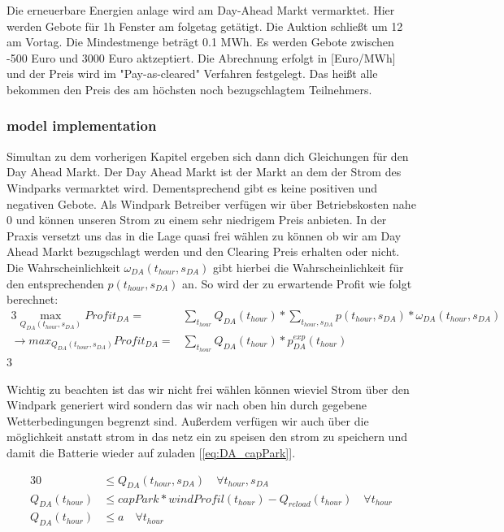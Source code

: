 Die erneuerbare Energien anlage wird am Day-Ahead Markt vermarktet. Hier werden Gebote für 1h Fenster am folgetag getätigt.
Die Auktion schließt um 12 am Vortag. Die Mindestmenge beträgt 0.1 MWh. Es werden Gebote zwischen -500 Euro und 3000 Euro aktzeptiert.
Die Abrechnung erfolgt in [Euro/MWh] und der Preis wird im "Pay-as-cleared" Verfahren festgelegt.
Das heißt alle bekommen den Preis des am höchsten noch bezugschlagtem Teilnehmers.

\subsubsection{model implementation}
Simultan zu dem vorherigen Kapitel ergeben sich dann dich Gleichungen für den Day Ahead Markt.
Der Day Ahead Markt ist der Markt an dem der Strom des Windparks vermarktet wird.
Dementsprechend gibt es keine positiven und negativen Gebote. Als Windpark Betreiber
verfügen wir über Betriebskosten nahe 0 und können unseren Strom zu einem sehr niedrigem Preis anbieten.
In der Praxis versetzt uns das in die Lage quasi frei wählen zu können ob wir am Day Ahead Markt bezugschlagt werden
und den Clearing Preis erhalten oder nicht.	Die Wahrscheinlichkeit $\omega_{DA}(t_{hour}, s_{DA})$ gibt hierbei die
Wahrscheinlichkeit für den entsprechenden $p(t_{hour}, s_{DA})$ an. So wird der zu erwartende Profit wie folgt berechnet:\\

\begin{alignat}{3}
	\max_{Q_{DA}(t_{hour}, s_{DA})} Profit_{DA}	=            & \sum_{t_{hour}} Q_{DA}(t_{hour}) * \sum_{t_{hour}, s_{DA}}  p(t_{hour}, s_{DA}) * \omega_{DA}(t_{hour}, s_{DA}) \\
	\rightarrow max_{Q_{DA}(t_{hour}, s_{DA})} Profit_{DA}	= & \sum_{t_{hour}} Q_{DA}(t_{hour}) * p^{exp}_{DA}(t_{hour})
\end{alignat}{3}


Wichtig zu beachten ist das wir nicht frei wählen können wieviel Strom über den Windpark generiert wird
sondern das wir nach oben hin durch gegebene Wetterbedingungen begrenzt sind.
Außerdem verfügen wir auch über die möglichkeit anstatt strom in das netz ein zu speisen den strom zu speichern und damit die
Batterie wieder auf zuladen [\ref{eq:DA_capPark}].


\begin{alignat}{3}
	0                & \leq Q_{DA}(t_{hour}, s_{DA}) \quad\forall  t_{hour}, s_{DA}      \label{eq:DA_nonNeg}                 \\
	Q_{DA}(t_{hour}) & \leq capPark * windProfil(t_{hour}) - Q_{reload}(t_{hour}) \quad\forall t_{hour} \label{eq:DA_capPark} \\
	Q_{DA}(t_{hour}) & \leq a \quad\forall t_{hour} \label{eq:DA_a}
\end{alignat}


